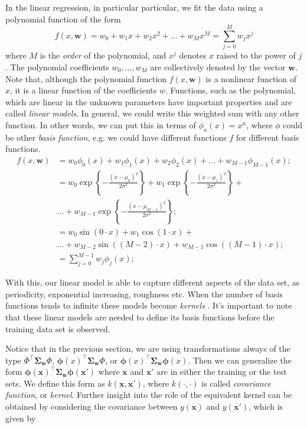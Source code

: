 \documentclass[11pt]{article} %
\begin{document}
In the linear regression, in particular particular, we fit the data using a polynomial function of the form
%
\begin{equation}
      f(x, \mathbf{w})=w_{0}+w_{1} x+w_{2} x^{2}+\ldots+w_{M} x^{M}=\sum_{j=0}^{M} w_{j} x^{j}
      \label{eq:intro-poly}
\end{equation}
%
where $M$ is the \textit{order} of the polynomial, and $x^j$ denotes $x$ raised to the power of $j$. The polynomial coefficients $w_0, \dots , w_M$ are collectively denoted by the vector $\mathbf{w}$. Note that, although the polynomial function $f(x, \mathbf{w})$ is a nonlinear function of $x$, it is a linear function of the coefficients $w$. Functions, such as the polynomial, which are linear in the unknown parameters have important properties and are called \textit{linear models}. In general, we could write this weighted sum with any other function. In other words, we can put this in terms of $\phi_n(x)=x^n$, where $\phi$ could be other \textit{basis function}, e.g. we could have different functions $f$ for different basis functions.
%
\begin{align*}
      f(x,\mathbf{w}) &= w_0 \phi_0(x) +w_1 \phi_1(x) +w_2 \phi_2(x)  + ... + w_{M-1} \phi_{M-1}(x); \\
                        &= w_0 \exp\left\{ - \frac{(x-\mu_0)^2}{2\sigma^2}\right\} + w_1  \exp\left\{ - \frac{(x-\mu_1)^2}{2\sigma^2}\right\} + \\ & ... + w_{M-1} \exp\left\{ - \frac{(x-\mu_{M-1})^2}{2\sigma^2}\right\}; \\
                        &= w_0 \sin(0 \cdot x) + w_1 \cos(1 \cdot x) + \\ &... + w_{M-2} \sin((M-2) \cdot x) + w_{M-1} \cos((M-1) \cdot x); \\
                        &=\sum_{j=0}^{M-1} w_{j} \phi_{j}(x);
\end{align*}
%

With this, our linear model is able to capture different aspects of the data set, as periodicity, exponential increasing, roughness etc. When the number of basis functions tends to infinite these models become \textit{kernels} \cite{mackay1998introduction}. It's important to note that these linear models are needed to define its basis functions before the training data set is observed.

Notice that in the previous section, we are using transformations always of the type $\Phi^{\top} \boldsymbol{\Sigma}_\mathbf{w} \Phi$, $\boldsymbol{\phi}(x)^{\top} \boldsymbol{\Sigma}_\mathbf{w} \Phi$, or $\boldsymbol{\phi}(x)^{\top} \boldsymbol{\Sigma}_\mathbf{w} \boldsymbol{\phi}(x)$. Then we can generalize the form $\boldsymbol{\phi}(\mathbf{x})^\top \boldsymbol{\Sigma}_\mathbf{w}\boldsymbol{\phi}(\mathbf{x'})$ where $\mathbf{x}$ and $\mathbf{x'}$ are in either the training or the test sets. We define this form as $k(\mathbf{x},\mathbf{x'})$, where $k(\cdot,\cdot)$ is called \textit{covariance function}, or \textit{kernel}. Further insight into the role of the equivalent kernel can be obtained by considering the covariance between $y(\mathbf{x})$ and $y(\mathbf{x'})$, which is given by
\end{document}
